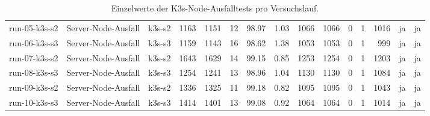 \begin{table}
{\begin{tabular}{l l l r r r r r r r r r r l l}
run-05-k3s-s2 & Server-Node-Ausfall & k3s-s2 & 1163 & 1151 & 12 & 98.97 & 1.03 & 1066 & 1066 & 0 & 1 & 1016 & ja & ja \\
run-06-k3s-s3 & Server-Node-Ausfall & k3s-s3 & 1159 & 1143 & 16 & 98.62 & 1.38 & 1053 & 1053 & 0 & 1 & 999 & ja & ja \\
run-07-k3s-s2 & Server-Node-Ausfall & k3s-s2 & 1643 & 1629 & 14 & 99.15 & 0.85 & 1253 & 1254 & 0 & 1 & 1203 & ja & ja \\
run-08-k3s-s3 & Server-Node-Ausfall & k3s-s3 & 1254 & 1241 & 13 & 98.96 & 1.04 & 1130 & 1130 & 0 & 1 & 1084 & ja & ja \\
run-09-k3s-s2 & Server-Node-Ausfall & k3s-s2 & 1336 & 1325 & 11 & 99.18 & 0.82 & 1095 & 1095 & 0 & 1 & 1043 & ja & ja \\
run-10-k3s-s3 & Server-Node-Ausfall & k3s-s3 & 1414 & 1401 & 13 & 99.08 & 0.92 & 1064 & 1064 & 0 & 1 & 1014 & ja & ja \\
\bottomrule
\end{tabular}%
}
\caption{Einzelwerte der K3s-Node-Ausfalltests pro Versuchslauf.}
\label{tab:appendix-k3s-node-failure-runs}
\end{table}
